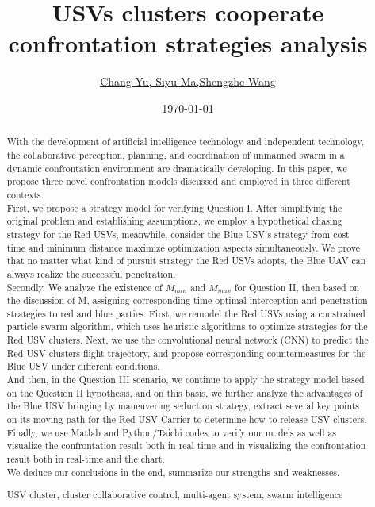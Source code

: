 \documentclass{mcmthesis}
\title{  USVs clusters cooperate confrontation strategies analysis}
\author{\small \href{http://www.latexstudio.net/}
  {Chang Yu, \space \space \space \space \space  Siyu Ma,\space  \space  \space  \space  \space Shengzhe Wang}}
\date{\today}
\begin{document}
\begin{abstract}
With the development of artificial intelligence technology and independent technology, the collaborative perception, planning, and coordination of unmanned swarm in a dynamic confrontation environment are dramatically developing. In this paper, we propose three novel confrontation models discussed and employed in three different contexts. \\
First, we propose a strategy model for verifying Question I. After simplifying the original problem and establishing assumptions, we employ a hypothetical chasing strategy for the Red USVs, meanwhile, consider the Blue USV's strategy from cost time and minimum distance maximize optimization aspects simultaneously. We prove that no matter what kind of pursuit strategy the Red USVs adopts, the Blue UAV can always realize the successful penetration. \\
Secondly, We analyze the existence of $M_{min}$ and $M_{max}$ for Question II, then based on the discussion of M, assigning corresponding time-optimal interception and penetration strategies to red and blue parties. First, we remodel the Red USVs using a constrained particle swarm algorithm, which uses heuristic algorithms to optimize strategies for the Red USV clusters. Next, we use the convolutional neural network (CNN) to predict the Red USV clusters flight trajectory, and propose corresponding countermeasures for the Blue USV under different conditions. \\
And then, in the Question III scenario, we continue to apply the strategy model based on the Question II hypothesis, and on this basis, we further analyze the advantages of the Blue USV bringing by maneuvering seduction strategy, extract several key points on its moving path for the Red USV Carrier to determine how to release USV clusters. \\
Finally, we use Matlab and Python/Taichi codes to verify our models as well as visualize the confrontation result both in real-time and in visualizing the confrontation result both in real-time and the chart. \\
We deduce our conclusions in the end, summarize our strengths and weaknesses.
\begin{keywords}
USV cluster, cluster collaborative control, multi-agent system, swarm intelligence
\end{keywords}
\end{abstract}
\maketitle
\tableofcontents
\newpage
\end{document}
